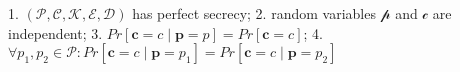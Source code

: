 1. $(\mathcal{P, C, K, E, D})$ has perfect secrecy;
2. random variables $\mathcal{p}$ and $\mathcal{c}$ are independent;
3. $Pr[\mathbf{c} = c \mid \mathbf{p} = p] = Pr[\mathbf{c} = c]$;
4. $∀ p_1, p_2 ∈ \mathcal{P}:
   Pr[\mathbf{c} = c \mid \mathbf{p}=p_1] =
   Pr[\mathbf{c} = c \mid \mathbf{p}=p_2]$
